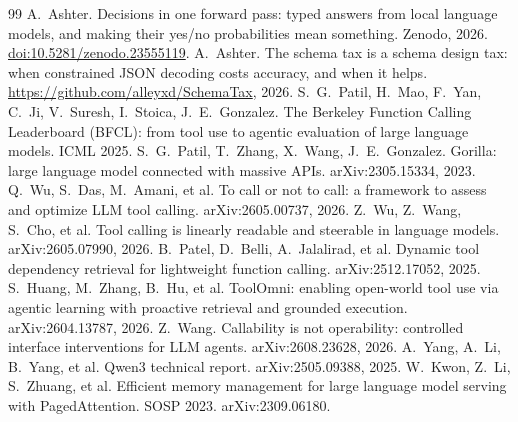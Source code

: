\documentclass[10pt,twocolumn]{article}
\begin{document}
\begin{thebibliography}{99}\small
{} A.~Ashter. Decisions in one forward pass: typed answers from local language models, and making their yes/no probabilities mean something. Zenodo, 2026. \href{https://doi.org/10.5281/zenodo.23555119}{doi:10.5281/zenodo.23555119}.
 A.~Ashter. The schema tax is a schema design tax: when constrained JSON decoding costs accuracy, and when it helps. \url{https://github.com/alleyxd/SchemaTax}, 2026.
 S.~G.~Patil, H.~Mao, F.~Yan, C.~Ji, V.~Suresh, I.~Stoica, J.~E.~Gonzalez. The Berkeley Function Calling Leaderboard (BFCL): from tool use to agentic evaluation of large language models. ICML 2025.
 S.~G.~Patil, T.~Zhang, X.~Wang, J.~E.~Gonzalez. Gorilla: large language model connected with massive APIs. arXiv:2305.15334, 2023.
 Q.~Wu, S.~Das, M.~Amani, et al. To call or not to call: a framework to assess and optimize LLM tool calling. arXiv:2605.00737, 2026.
 Z.~Wu, Z.~Wang, S.~Cho, et al. Tool calling is linearly readable and steerable in language models. arXiv:2605.07990, 2026.
 B.~Patel, D.~Belli, A.~Jalalirad, et al. Dynamic tool dependency retrieval for lightweight function calling. arXiv:2512.17052, 2025.
 S.~Huang, M.~Zhang, B.~Hu, et al. ToolOmni: enabling open-world tool use via agentic learning with proactive retrieval and grounded execution. arXiv:2604.13787, 2026.
 Z.~Wang. Callability is not operability: controlled interface interventions for LLM agents. arXiv:2608.23628, 2026.
 A.~Yang, A.~Li, B.~Yang, et al. Qwen3 technical report. arXiv:2505.09388, 2025.
 W.~Kwon, Z.~Li, S.~Zhuang, et al. Efficient memory management for large language model serving with PagedAttention. SOSP 2023. arXiv:2309.06180.
\end{thebibliography}
\end{document}
